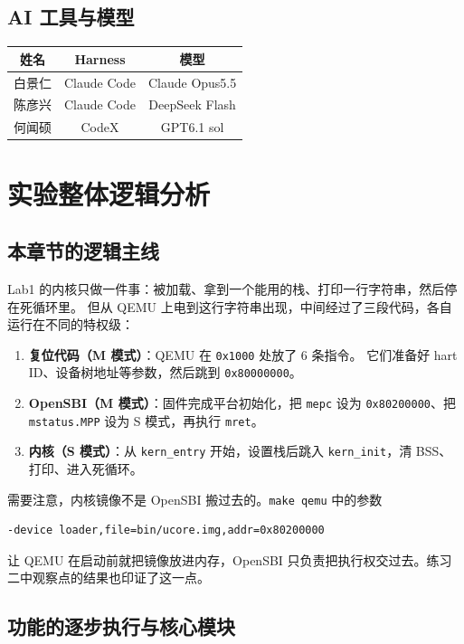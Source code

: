 \documentclass[UTF8,a4paper,10pt,fontset=none]{ctexart}
\begin{document}
\subsection{AI 工具与模型}
\begin{table}[H]
    \centering
    \begin{tabular}{|c|c|c|}
        \hline
        姓名 & Harness & 模型 \\
        \hline
        白景仁 & Claude Code & Claude Opus5.5 \\
        陈彦兴 & Claude Code & DeepSeek Flash \\
        何闻硕 & CodeX & GPT6.1 sol \\
        \hline
    \end{tabular}
\end{table}

\section{实验整体逻辑分析}
\subsection{本章节的逻辑主线}
Lab1 的内核只做一件事：被加载、拿到一个能用的栈、打印一行字符串，然后停在死循环里。
但从 QEMU 上电到这行字符串出现，中间经过了三段代码，各自运行在不同的特权级：

\begin{enumerate}
    \item \textbf{复位代码（M 模式）}：QEMU 在 \texttt{0x1000} 处放了 6 条指令。
          它们准备好 hart ID、设备树地址等参数，然后跳到 \texttt{0x80000000}。
    \item \textbf{OpenSBI（M 模式）}：固件完成平台初始化，把 \texttt{mepc} 设为
          \texttt{0x80200000}、把 \texttt{mstatus.MPP} 设为 S 模式，再执行 \texttt{mret}。
    \item \textbf{内核（S 模式）}：从 \texttt{kern\_entry} 开始，设置栈后跳入
          \texttt{kern\_init}，清 BSS、打印、进入死循环。
\end{enumerate}

需要注意，内核镜像不是 OpenSBI 搬过去的。\texttt{make qemu} 中的参数
\begin{verbatim}
-device loader,file=bin/ucore.img,addr=0x80200000
\end{verbatim}
让 QEMU 在启动前就把镜像放进内存，OpenSBI 只负责把执行权交过去。练习二中观察点的结果也印证了这一点。

\subsection{功能的逐步执行与核心模块}
\end{document}
